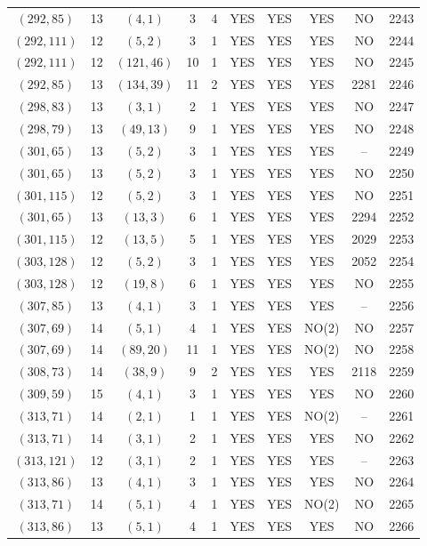 \begin{longtable}{|c|c|c|c|c|c|c|c|c|c|}
$(292, 85)$ & 13 & $(4, 1)$ & 3 & 4 & YES & YES & YES & NO & 2243\\
$(292, 111)$ & 12 & $(5, 2)$ & 3 & 1 & YES & YES & YES & NO & 2244\\
$(292, 111)$ & 12 & $(121, 46)$ & 10 & 1 & YES & YES & YES & NO & 2245\\
$(292, 85)$ & 13 & $(134, 39)$ & 11 & 2 & YES & YES & YES & 2281 & 2246\\
$(298, 83)$ & 13 & $(3, 1)$ & 2 & 1 & YES & YES & YES & NO & 2247\\
$(298, 79)$ & 13 & $(49, 13)$ & 9 & 1 & YES & YES & YES & NO & 2248\\
$(301, 65)$ & 13 & $(5, 2)$ & 3 & 1 & YES & YES & YES & -- & 2249\\
$(301, 65)$ & 13 & $(5, 2)$ & 3 & 1 & YES & YES & YES & NO & 2250\\
$(301, 115)$ & 12 & $(5, 2)$ & 3 & 1 & YES & YES & YES & NO & 2251\\
$(301, 65)$ & 13 & $(13, 3)$ & 6 & 1 & YES & YES & YES & 2294 & 2252\\
$(301, 115)$ & 12 & $(13, 5)$ & 5 & 1 & YES & YES & YES & 2029 & 2253\\
$(303, 128)$ & 12 & $(5, 2)$ & 3 & 1 & YES & YES & YES & 2052 & 2254\\
$(303, 128)$ & 12 & $(19, 8)$ & 6 & 1 & YES & YES & YES & NO & 2255\\
$(307, 85)$ & 13 & $(4, 1)$ & 3 & 1 & YES & YES & YES & -- & 2256\\
$(307, 69)$ & 14 & $(5, 1)$ & 4 & 1 & YES & YES & NO(2) & NO & 2257\\
$(307, 69)$ & 14 & $(89, 20)$ & 11 & 1 & YES & YES & NO(2) & NO & 2258\\
$(308, 73)$ & 14 & $(38, 9)$ & 9 & 2 & YES & YES & YES & 2118 & 2259\\
$(309, 59)$ & 15 & $(4, 1)$ & 3 & 1 & YES & YES & YES & NO & 2260\\
$(313, 71)$ & 14 & $(2, 1)$ & 1 & 1 & YES & YES & NO(2) & -- & 2261\\
$(313, 71)$ & 14 & $(3, 1)$ & 2 & 1 & YES & YES & YES & NO & 2262\\
$(313, 121)$ & 12 & $(3, 1)$ & 2 & 1 & YES & YES & YES & -- & 2263\\
$(313, 86)$ & 13 & $(4, 1)$ & 3 & 1 & YES & YES & YES & NO & 2264\\
$(313, 71)$ & 14 & $(5, 1)$ & 4 & 1 & YES & YES & NO(2) & NO & 2265\\
$(313, 86)$ & 13 & $(5, 1)$ & 4 & 1 & YES & YES & YES & NO & 2266\\

\end{longtable}
